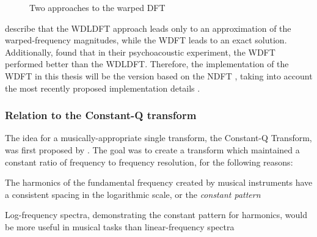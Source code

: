 \documentclass[letter,12pt,notitlepage]{article}
\newenvironment{tight_itemize}{
\begin{itemize}
  \setlength{\itemsep}{0pt}
  \setlength{\parskip}{0pt}
}{\end{itemize}}
\begin{document}
\begin{figure}[ht]
	\centering
	\caption{Two approaches to the warped DFT}
	\label{fig:wdfts}
\end{figure}

\citet{warped1} describe that the WDLDFT approach leads only to an approximation of the warped-frequency magnitudes, while the WDFT leads to an exact solution. Additionally, \citet{warpedcomparison} found that in their psychoacoustic experiment, the WDFT performed better than the WDLDFT. Therefore, the implementation of the WDFT in this thesis will be the version based on the NDFT \cite{warped1}, taking into account the most recently proposed implementation details \cite{warped2}.


\subsubsection{Relation to the Constant-Q transform}

The idea for a musically-appropriate single transform, the Constant-Q Transform, was first proposed by \citet{jbrown}. The goal was to create a transform which maintained a constant ratio of frequency to frequency resolution, for the following reasons:

\begin{tight_itemize}
	\item
		The harmonics of the fundamental frequency created by musical instruments have a consistent spacing in the logarithmic scale, or the \textit{constant pattern}
	\item
		Log-frequency spectra, demonstrating the constant pattern for harmonics, would be more useful in musical tasks than linear-frequency spectra
\end{tight_itemize}
\end{document}

